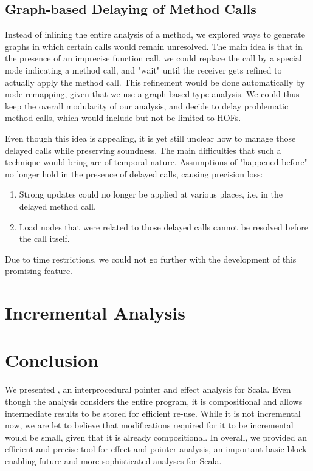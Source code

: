 \subsection{Graph-based Delaying of Method Calls}
Instead of inlining the entire analysis of a method, we explored ways to
generate graphs in which certain calls would remain unresolved. The main idea
is that in the presence of an imprecise function call, we could replace the
call by a special node indicating a method call, and "wait" until the receiver
gets refined to actually apply the method call. This refinement would be done
automatically by node remapping, given that we use a graph-based type analysis.
We could thus keep the overall modularity of our analysis, and decide to delay
problematic method calls, which would include but not be limited to HOFs.

Even though this idea is appealing, it is yet still unclear how to manage those
delayed calls while preserving soundness. The main difficulties that such a
technique would bring are of temporal nature. Assumptions of "happened before"
no longer hold in the presence of delayed calls, causing precision loss:
\begin{enumerate}
    \item Strong updates could no longer be applied at various places, i.e. in
    the delayed method call.
    \item Load nodes that were related to those delayed calls cannot be resolved
    before the call itself.
\end{enumerate}
Due to time restrictions, we could not go further with the development of this
promising feature.

\section{Incremental Analysis}

\section{Conclusion}
We presented \insane, an interprocedural pointer and effect analysis for Scala.
Even though the analysis considers the entire program, it is compositional and
allows intermediate results to be stored for efficient re-use. While it
is not incremental now, we are let to believe that modifications required for
it to be incremental would be small, given that it is already compositional. In
overall, we provided an efficient and precise tool for effect and pointer
analysis, an important basic block enabling future and more sophisticated
analyses for Scala.
